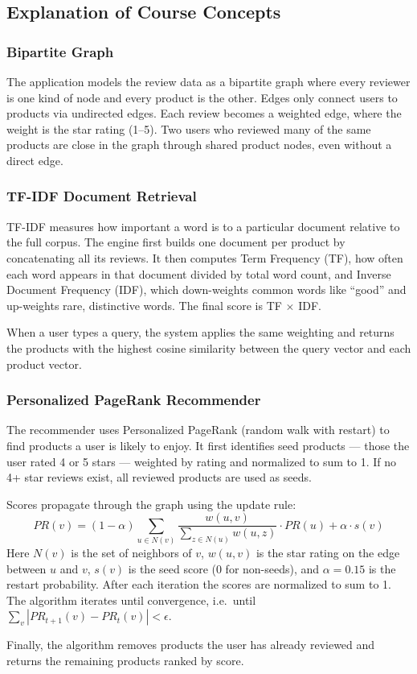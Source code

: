 \documentclass{article}
\begin{document}
\subsection*{Explanation of Course Concepts}

\subsubsection*{Bipartite Graph}

The application models the review data as a bipartite graph where every reviewer is one kind of node and every product is the other. Edges only connect users to products via undirected edges. Each review becomes a weighted edge, where the weight is the star rating (1--5). Two users who reviewed many of the same products are close in the graph through shared product nodes, even without a direct edge.

\subsubsection*{TF-IDF Document Retrieval}

TF-IDF measures how important a word is to a particular document relative to the full corpus. The engine first builds one document per product by concatenating all its reviews. It then computes Term Frequency (TF), how often each word appears in that document divided by total word count, and Inverse Document Frequency (IDF), which down-weights common words like ``good'' and up-weights rare, distinctive words. The final score is TF $\times$ IDF.

When a user types a query, the system applies the same weighting and returns the products with the highest cosine similarity between the query vector and each product vector.

\subsubsection*{Personalized PageRank Recommender}

The recommender uses Personalized PageRank (random walk with restart) to find products a user is likely to enjoy. It first identifies seed products --- those the user rated 4 or 5 stars --- weighted by rating and normalized to sum to 1. If no 4+ star reviews exist, all reviewed products are used as seeds.

Scores propagate through the graph using the update rule:
\[
PR(v) = (1 - \alpha) \sum_{u \in N(v)} \frac{w(u,v)}{\sum_{z \in N(u)} w(u,z)} \cdot PR(u) + \alpha \cdot s(v)
\]
Here $N(v)$ is the set of neighbors of $v$, $w(u,v)$ is the star rating on the edge between $u$ and $v$, $s(v)$ is the seed score (0 for non-seeds), and $\alpha = 0.15$ is the restart probability. After each iteration the scores are normalized to sum to 1. The algorithm iterates until convergence, i.e.\ until $\sum_{v} |PR_{t+1}(v) - PR_t(v)| < \epsilon$.

Finally, the algorithm removes products the user has already reviewed and returns the remaining products ranked by score.
\end{document}
